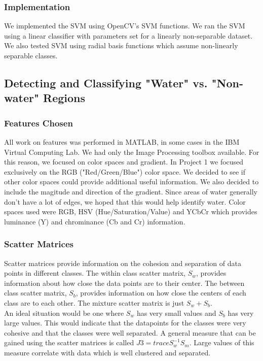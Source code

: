 \documentclass[12pt]{article}
\begin{document}
	\subsubsection{Implementation}
	We implemented the SVM using OpenCV's SVM functions. We ran the SVM using a linear classifier with parameters set for a linearly non-separable dataset. We also tested SVM using radial basis functions which assume non-linearly separable classes. 
	\subsection{Detecting and Classifying "Water" vs. "Non-water" Regions}
	\subsubsection{Features Chosen}
	All work on features was performed in MATLAB, in some cases in the IBM Virtual Computing Lab. We had only the Image Processing toolbox available. For this reason, we focused on color spaces and gradient. In Project 1 we focused exclusively on the RGB ("Red/Green/Blue") color space. We decided to see if other color spaces could provide additional useful information. We also decided to include the magitude and direction of the gradient. Since areas of water generally don't have a lot of edges, we hoped that this would help identify water. Color spaces used were RGB, HSV (Hue/Saturation/Value) and YCbCr which provides luminance (Y) and chrominance (Cb and Cr) information.\\
	\subsubsection{Scatter Matrices}
	Scatter matrices provide information on the cohesion and separation of data points in different classes. The within class scatter matrix, $S_w$, provides information about how close the data points are to their center. The between class scatter matrix, $S_b$, provides information on how close the centers of each class are to each other. The mixture scatter matrix is just $S_w + S_b$.\\
	An ideal situation would be one where $S_w$ has very small values and $S_b$ has very large values. This would indicate that the datapoints for the classes were very cohesive and that the classes were well separated. 
	A general measure that can be gained using the scatter matrices is called $J3=trace{S_w^{-1}S_m}$. Large values of this measure correlate with data which is well clustered and separated.
\end{document}
